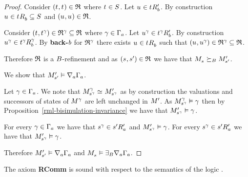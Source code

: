 \begin{proof}
Consider $(\kStateT, \kStateT) \in \refinement$ where $\kStateT \in \kStates$.
Let $\kStateU \in \kSuccessorsPB{\kStateT}$.
By construction $\kStateU \in \kSuccessorsB{\kStateT} \subseteq \kStates$ and $(\kStateU, \kStateU) \in \refinement$.

Consider $(\kStateT, \kStateT[\gamma]) \in \refinement^\gamma \subseteq \refinement$ where $\gamma \in \Gamma_\agentA$.
Let $\kStateU[\gamma] \in \kSuccessorsPB{\kStateT[\gamma]}$.
By construction $\kStateU[\gamma] \in \kSuccessorsB[\gamma]{\kStateT[\gamma]}$.
By {\bf back-$\agentB$} for $\refinement^\gamma$ there exists $\kStateU \in \kSuccessorsB{\kStateT}$ such that $(\kStateU, \kStateU[\gamma]) \in \refinement^\gamma \subseteq \refinement$.

Therefore $\refinement$ is a $\agentsB$-refinement and as $(\kStateS, \kStateSP) \in \refinement$ we have that $\kPModel{\kStateS} \simulatesBs \kPModelP{\kStateSP}$.

We show that $\kPModelP{\kStateSP} \entails \coversA \Gamma_\agentA$.

Let $\gamma \in \Gamma_\agentA$.
We note that $\kPModel[\gamma]{\kStateS[\gamma]} \bisimilar \kPModelP{\kStateS[\gamma]}$ as by construction the valuations and successors of states of $\kModel[\gamma]$ are left unchanged in $\kModelP$.
As $\kPModel[\gamma]{\kStateS[\gamma]} \entails \gamma$ then by Proposition~\ref{rml-bisimulation-invariance} we have that $\kPModelP{\kStateS[\gamma]} \entails \gamma$.

For every $\gamma \in \Gamma_\agentA$ we have that $\kStateS[\gamma] \in \kSuccessorsPA{\kStateSP}$ and $\kPModelP{\kStateS[\gamma]} \entails \gamma$.
For every $\kStateS[\gamma] \in \kSuccessorsPA{\kStateSP}$ we have that $\kPModelP{\kStateS[\gamma]} \entails \gamma$.

Therefore $\kPModelP{\kStateSP} \entails \coversA \Gamma_\agentA$ and $\kPModel{\kStateS} \entails \somerefsBs \coversA \Gamma_\agentA$.
\end{proof}

\begin{lemma}\label{rml-k-rcomm}
The axiom {\bf RComm} is sound with respect to the semantics of the logic \logicRmlK{}.
\end{lemma}

